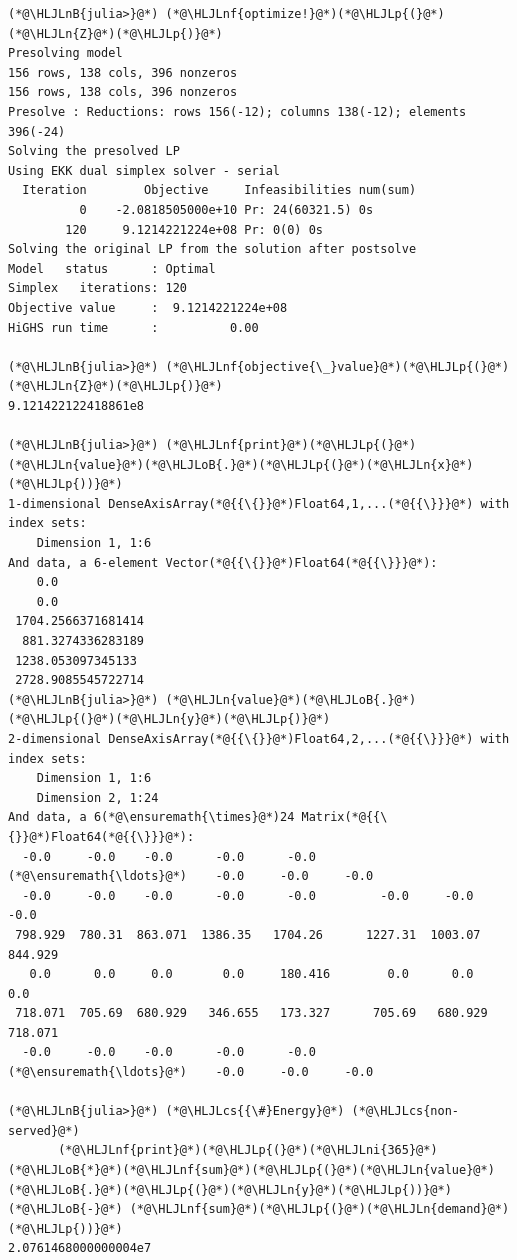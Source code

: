 \documentclass[12pt,a4paper]{article}
\newcommand{\HLJLn}[1]{#1}
\newcommand{\HLJLnf}[1]{\textcolor[RGB]{66,102,213}{#1}}
\newcommand{\HLJLnB}[1]{\textcolor[RGB]{59,151,46}{#1}}
\newcommand{\HLJLni}[1]{\textcolor[RGB]{59,151,46}{#1}}
\newcommand{\HLJLoB}[1]{\textcolor[RGB]{102,102,102}{\textbf{#1}}}
\newcommand{\HLJLp}[1]{#1}
\newcommand{\HLJLcs}[1]{\textcolor[RGB]{153,153,119}{\textit{#1}}}
\begin{document}
\begin{lstlisting}
(*@\HLJLnB{julia>}@*) (*@\HLJLnf{optimize!}@*)(*@\HLJLp{(}@*)(*@\HLJLn{Z}@*)(*@\HLJLp{)}@*)
Presolving model
156 rows, 138 cols, 396 nonzeros
156 rows, 138 cols, 396 nonzeros
Presolve : Reductions: rows 156(-12); columns 138(-12); elements 396(-24)
Solving the presolved LP
Using EKK dual simplex solver - serial
  Iteration        Objective     Infeasibilities num(sum)
          0    -2.0818505000e+10 Pr: 24(60321.5) 0s
        120     9.1214221224e+08 Pr: 0(0) 0s
Solving the original LP from the solution after postsolve
Model   status      : Optimal
Simplex   iterations: 120
Objective value     :  9.1214221224e+08
HiGHS run time      :          0.00

(*@\HLJLnB{julia>}@*) (*@\HLJLnf{objective{\_}value}@*)(*@\HLJLp{(}@*)(*@\HLJLn{Z}@*)(*@\HLJLp{)}@*)
9.121422122418861e8

(*@\HLJLnB{julia>}@*) (*@\HLJLnf{print}@*)(*@\HLJLp{(}@*)(*@\HLJLn{value}@*)(*@\HLJLoB{.}@*)(*@\HLJLp{(}@*)(*@\HLJLn{x}@*)(*@\HLJLp{))}@*)
1-dimensional DenseAxisArray(*@{{\{}}@*)Float64,1,...(*@{{\}}}@*) with index sets:
    Dimension 1, 1:6
And data, a 6-element Vector(*@{{\{}}@*)Float64(*@{{\}}}@*):
    0.0
    0.0
 1704.2566371681414
  881.3274336283189
 1238.053097345133
 2728.9085545722714
(*@\HLJLnB{julia>}@*) (*@\HLJLn{value}@*)(*@\HLJLoB{.}@*)(*@\HLJLp{(}@*)(*@\HLJLn{y}@*)(*@\HLJLp{)}@*)
2-dimensional DenseAxisArray(*@{{\{}}@*)Float64,2,...(*@{{\}}}@*) with index sets:
    Dimension 1, 1:6
    Dimension 2, 1:24
And data, a 6(*@\ensuremath{\times}@*)24 Matrix(*@{{\{}}@*)Float64(*@{{\}}}@*):
  -0.0     -0.0    -0.0      -0.0      -0.0    (*@\ensuremath{\ldots}@*)    -0.0     -0.0     -0.0
  -0.0     -0.0    -0.0      -0.0      -0.0         -0.0     -0.0     -0.0
 798.929  780.31  863.071  1386.35   1704.26      1227.31  1003.07   844.929
   0.0      0.0     0.0       0.0     180.416        0.0      0.0      0.0
 718.071  705.69  680.929   346.655   173.327      705.69   680.929  718.071
  -0.0     -0.0    -0.0      -0.0      -0.0    (*@\ensuremath{\ldots}@*)    -0.0     -0.0     -0.0

(*@\HLJLnB{julia>}@*) (*@\HLJLcs{{\#}Energy}@*) (*@\HLJLcs{non-served}@*)
       (*@\HLJLnf{print}@*)(*@\HLJLp{(}@*)(*@\HLJLni{365}@*)(*@\HLJLoB{*}@*)(*@\HLJLnf{sum}@*)(*@\HLJLp{(}@*)(*@\HLJLn{value}@*)(*@\HLJLoB{.}@*)(*@\HLJLp{(}@*)(*@\HLJLn{y}@*)(*@\HLJLp{))}@*) (*@\HLJLoB{-}@*) (*@\HLJLnf{sum}@*)(*@\HLJLp{(}@*)(*@\HLJLn{demand}@*)(*@\HLJLp{))}@*)
2.0761468000000004e7
\end{lstlisting}
\end{document}

